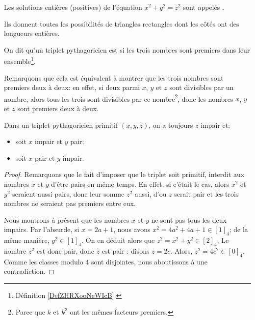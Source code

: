 \begin{definition}
    Les solutions entières (positives) de l'équation \( x^2+y^2=z^2\) sont appelés .
\end{definition}

Ils donnent toutes les possibilités de triangles rectangles dont les côtés ont des longueurs entières.

\begin{definition}
  On dit qu'un triplet pythagoricien est  si les trois nombres sont premiers dans leur ensemble\footnote{Définition \ref{DefZHRXooNeWIcB}.}.
\end{definition}

Remarquons que cela est équivalent à montrer que les trois nombres sont premiers deux à deux: en effet, si deux parmi \( x\), \( y\) et \( z\) sont divisibles par un nombre, alors tous les trois sont divisibles par ce nombre\footnote{Parce que \( k\) et \( k^2\) ont les mêmes facteurs premiers.}, donc les nombres \( x\), \( y\) et \( z\) sont premiers deux à deux.

\begin{lemma}    \label{LemTripletsPythagoriciensPrimitifs}
  Dans un triplet pythagoricien primitif \( (x, y, z) \), on a toujours $z$ impair et:
  \begin{itemize}
  \item
    soit $x$ impair et $y$ pair;
  \item
    soit $x$ pair et $y$ impair.
  \end{itemize}
\end{lemma}

\begin{proof}
  Remarquons que le fait d'imposer que le triplet soit primitif, interdit aux nombres $x$ et $y$ d'être pairs en même temps. En effet, si c'était le cas, alors \( x^2 \) et \( y^2 \) seraient aussi pairs, donc leur somme \( z^2 \) aussi, d'ou $z$ serait pair et les trois nombres ne seraient pas premiers entre eux.

  Nous montrons à présent que les nombres \( x\) et \( y\) ne sont pas tous les deux impairs. Par l'absurde, si \( x=2a+1\), nous avons \( x^2=4a^2+4a+1\in [1]_4\); de la même manière,  \( y^2 \in [1]_4\). On en déduit alors que \( z^2=x^2+y^2\in [2]_4\). Le nombre \(  z^2\) est donc pair, donc \( z\) est pair : disons \( z=2c\). Alors, \( z^2=4c^2\in [0]_4\). Comme les classes modulo 4 sont disjointes, nous aboutissons à une contradiction.
\end{proof}

